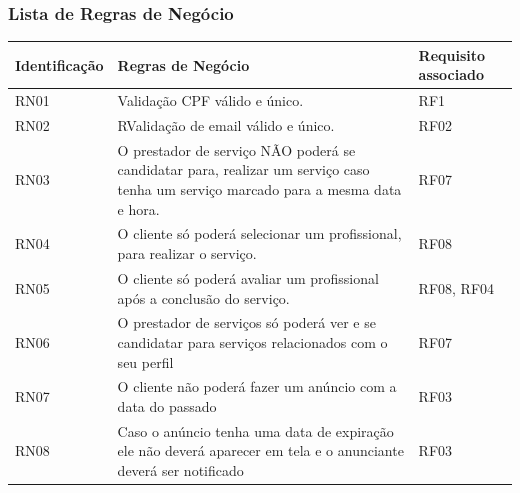 \subsubsection{ Lista de Regras de Negócio}

\begin{tabular}{|l|p{8cm}|p{3cm}|}
	\hline
	\textbf{Identificação} & \textbf{Regras de Negócio} & \textbf{Requisito associado} \\ \hline
	RN01 & Validação CPF válido e único. & RF1 \\ \hline
	RN02 & RValidação de email válido e único. & RF02 \\ \hline
	RN03 & O prestador de serviço NÃO poderá se candidatar para, realizar um serviço caso tenha um serviço marcado para a mesma data e hora. & RF07 \\ \hline
	RN04 & O cliente só poderá selecionar um profissional, para realizar o serviço. & RF08 \\ \hline
	RN05 & O cliente só poderá avaliar um profissional após a conclusão do serviço. & RF08, RF04 \\ \hline
	RN06 & O prestador de serviços só poderá ver e se candidatar para serviços relacionados com o seu perfil  & RF07 \\ \hline
	RN07 & O cliente não poderá fazer um anúncio com a data do passado  & RF03 \\ \hline
	RN08 & Caso o anúncio tenha uma data de expiração ele não deverá aparecer em tela e o anunciante deverá ser notificado & RF03 \\ \hline
\end{tabular}

